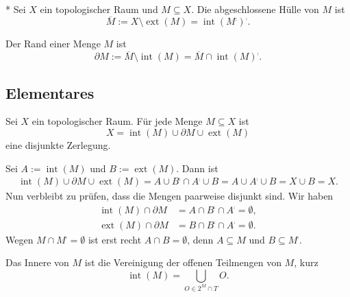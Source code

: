 \begin{Definition}\mbox{}\\*
Sei $X$ ein topologischer Raum und $M\subseteq X$. Die abgeschlossene Hülle von $M$ ist%
\[\overline M := X\setminus\operatorname{ext}(M) = \operatorname{int}(M^\comp)^\comp.\]
\end{Definition}

\begin{Definition}[Rand]
Der Rand einer Menge $M$ ist
\[\partial M := \overline M\setminus\operatorname{int}(M)
= \overline M\cap\operatorname{int}(M)^\comp.\]
\end{Definition}

\newpage
\subsection{Elementares}

\begin{Korollar}\label{partition-int-bd-ext}
Sei $X$ ein topologischer Raum. Für jede Menge $M\subseteq X$ ist%
\[X = \operatorname{int}(M)\cup\partial M\cup\operatorname{ext}(M)\]
eine disjunkte Zerlegung.
\end{Korollar}
\begin{Beweis} Sei $A:=\operatorname{int}(M)$ und $B:=\operatorname{ext}(M)$. Dann ist
\begin{gather*}
\operatorname{int}(M)\cup\partial M\cup\operatorname{ext}(M)
= A\cup B^\comp\cap A^\comp\cup B
= A\cup A^\comp\cup B = X\cup B = X.
\end{gather*}
Nun verbleibt zu prüfen, dass die Mengen paarweise disjunkt sind. Wir haben%
\begin{align*}
\operatorname{int}(M)\cap\partial M &= A\cap B^\comp\cap A^\comp = \emptyset,\\
\operatorname{ext}(M)\cap\partial M &= B\cap B^\comp\cap A^\comp = \emptyset.
\end{align*}
Wegen $M\cap M^\comp=\emptyset$ ist erst recht $A\cap B=\emptyset$,
denn $A\subseteq M$ und $B\subseteq M^\comp$.\,\qedsymbol
\end{Beweis}

\begin{Satz}
Das Innere von $M$ ist die Vereinigung der offenen Teilmengen
von $M$, kurz%
\[\operatorname{int}(M) = \bigcup_{O\in 2^M\cap T} O.\]
\end{Satz}

